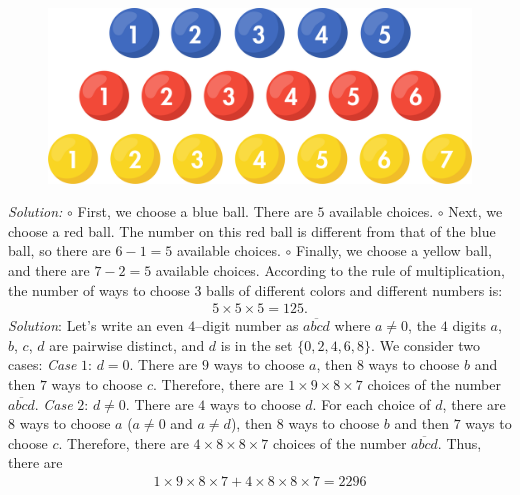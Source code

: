 \begin{multicols}{2}
	\begin{figure}[H]
		\centering
		\vspace*{-5pt}
		\captionsetup{labelformat= empty, justification=centering}
		\includegraphics[width=1\linewidth]{bong}
		\vspace*{-5pt}
	\end{figure}
	\textit{Solution:}
	\vskip 0.1cm 
	$\circ$ First, we choose a {\color{blue}blue ball}. There are $5$ available choices. 
	\vskip 0.1cm
	$\circ$ Next, we choose a {\color{red}red ball}. The number on this {\color{red}red ball} is different from that of the {\color{blue}blue ball}, so there are $6-1=5$ available choices. 
	\vskip 0.1cm
	$\circ$ Finally, we choose a {\color{amber}yellow ball}, and there are $7-2=5$ available choices. 
	\vskip 0.1cm
	According to the rule of multiplication, the number of ways to choose $3$ balls of different colors and different numbers is: 
	\begin{align*}
		5\times5\times5=125.
	\end{align*}
	\vskip 0.1cm
	\textit{Solution}:  Let’s write an even $4$--digit number as $\overline{abcd}$ where $a\ne 0$, the $4$ digits $a$, $b$, $c$, $d$ are pairwise distinct, and $d$ is in the set $\{0,2,4,6,8\}$.
	\vskip 0.1cm
	We consider two cases:
	\vskip 0.1cm
	\textit{Case} $1$: $d=0$. There are $9$ ways to choose $a$, then $8$ ways to choose $b$ and then $7$ ways to choose $c$. Therefore, there are $1\times 9\times8\times7$ choices of the number $\overline{abcd}$.
	\vskip 0.1cm
	\textit{Case} $2$: $d\ne0$. There are $4$ ways to choose $d$. For each choice of $d$, there are $8$ ways to choose $a$ ($a\ne0$ and $a\ne d$), then $8$ ways to choose $b$ and then $7$ ways to choose $c$. Therefore, there are $4
	\times8\times8\times7$ choices of the number $\overline{abcd}$.
	\vskip 0.1cm
	Thus, there are 
	\begin{align*}
		1\times9\times8\times7+4\times8\times8\times7 = 2296

\end{align*}
\end{multicols}
